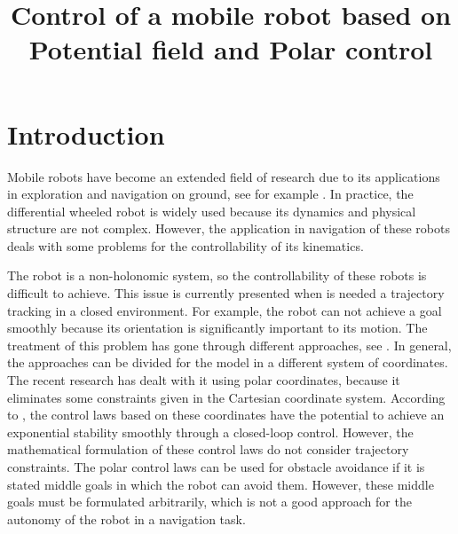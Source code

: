 \documentclass[conference]{IEEEtran}
\begin{document}
\title{Control of a mobile robot based on Potential field and Polar control}
\author{
}
\maketitle
\begin{abstract}

\end{abstract}
\IEEEpeerreviewmaketitle

\section{Introduction}

Mobile robots have become an extended field of research due to its applications in exploration and navigation on ground, see for example \cite{Desouza}\cite{Bonin-Font2008}. In practice, the differential wheeled robot is widely used because its dynamics and physical structure are not complex. However, the application in navigation of these robots deals with some problems for the controllability of its kinematics.

The robot is a non-holonomic system, so the controllability of these robots is difficult to achieve. This issue is currently presented when is needed a trajectory tracking in a closed environment. For example, the robot can not achieve a goal smoothly because its orientation is significantly important to its motion. The treatment of this problem has gone through different approaches, see \cite{Rubayat}\cite{Samson}\cite{Sung-On}. In general, the approaches can be divided for the model in a different system of coordinates. The recent research has dealt with it using polar coordinates, because it eliminates some constraints given in the Cartesian coordinate system. According to \cite{Matoui}, the control laws based on these coordinates have the potential to achieve an exponential stability smoothly through a closed-loop control. However, the mathematical formulation of these control laws do not consider trajectory constraints. The polar control laws can be used for obstacle avoidance if it is stated middle goals in which the robot can avoid them. However, these middle goals must be formulated arbitrarily, which is not a good approach for the autonomy of the robot in a navigation task.
\end{document}
